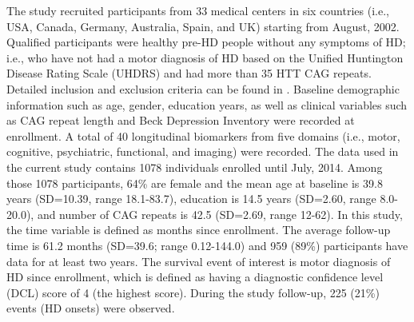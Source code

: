 The study recruited participants from 33 medical centers in six countries (i.e., USA, Canada, Germany, Australia, Spain, and UK) starting from August, 2002. Qualified participants were healthy pre-HD people without any symptoms of HD; i.e., who have not had a motor diagnosis of HD based on the Unified Huntington Disease Rating Scale (UHDRS) and had more than 35 HTT CAG repeats. Detailed inclusion and exclusion criteria can be found in \cite{paulsen2006preparing}. Baseline demographic information such as age, gender, education years, as well as clinical variables such as CAG repeat length and Beck Depression Inventory were recorded at enrollment. A total of 40 longitudinal biomarkers from five domains (i.e., motor, cognitive, psychiatric, functional, and imaging) were recorded. The data used in the current study contains 1078 individuals enrolled until July, 2014. Among those 1078 participants, 64\% are female and the mean age at baseline is 39.8 years (SD=10.39, range 18.1-83.7), education is 14.5 years (SD=2.60, range 8.0-20.0), and number of CAG repeats is 42.5 (SD=2.69, range 12-62). In this study, the time variable is defined as months since enrollment. The average follow-up time is 61.2 months (SD=39.6; range 0.12-144.0) and 959 (89\%) participants have data for at least two years. The survival event of interest is motor diagnosis of HD since enrollment, which is defined as having a diagnostic confidence level (DCL) score of 4 (the highest score)\citep{paulsen2014prediction}. During the study follow-up, 225 (21\%) events (HD onsets) were observed.





